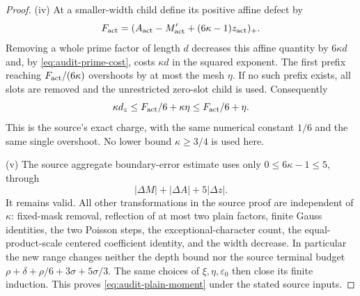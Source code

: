 \documentclass[11pt,a4paper]{article}
\numberwithin{equation}{section}
\theoremstyle{remark}
\begin{document}
\begin{proof}
(iv) At a smaller-width child define its positive affine defect by
\[
 F_{\rm act}=
 (A_{\rm act}-M'_{\rm act}+(6\kappa-1)z_{\rm act})_+.
\]
Removing a whole prime factor of length $d$ decreases this affine
quantity by $6\kappa d$ and, by \eqref{eq:audit-prime-cost}, costs
$\kappa d$ in the squared exponent.  The first prefix reaching
$F_{\rm act}/(6\kappa)$ overshoots by at most the mesh $\eta$.
If no such prefix exists, all slots are removed and the unrestricted
zero-slot child is used.  Consequently
\begin{equation}\label{eq:audit-greedy}
 \kappa d_z\le F_{\rm act}/6+\kappa\eta
                         \le F_{\rm act}/6+\eta.
\end{equation}
This is the source's exact charge, with the same numerical constant
$1/6$ and the same single overshoot.  No lower bound $\kappa\ge3/4$
is used here.

(v) The source aggregate boundary-error estimate uses only
$0\le6\kappa-1\le5$, through
\[
 |\Delta M|+|\Delta A|+5|\Delta z|.
\]
It remains valid.  All other transformations in the source proof are
independent of $\kappa$: fixed-mask removal, reflection of at most two
plain factors, finite Gauss identities, the two Poisson steps, the
exceptional-character count, the equal-product-scale centered
coefficient identity, and the width decrease.  In particular the new
range changes neither the depth bound nor the source terminal budget
$\rho+\delta+\rho/6+3\sigma+5\sigma/3$.
The same choices of $\xi,\eta,\varepsilon_0$ then close its finite
induction.  This proves \eqref{eq:audit-plain-moment} under the stated
source inputs.

\end{proof}
\end{document}
